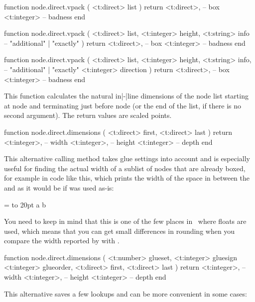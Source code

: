 \starttyping[option=LUA]
function node.direct.vpack (
    <t:direct> list
)
    return
        <t:direct>, -- box
        <t:integer> -- badness
end

function node.direct.vpack (
    <t:direct>  list,
    <t:integer> height,
    <t:string>  info -- "additional" | "exactly"
)
    return
        <t:direct>, -- box
        <t:integer> -- badness
end

function node.direct.vpack (
    <t:direct>  list,
    <t:integer> height,
    <t:string>  info, -- "additional" | "exactly"
    <t:integer> direction
)
    return
        <t:direct>, -- box
        <t:integer> -- badness
end
\stoptyping

This function calculates the natural in|-|line dimensions of the node list starting
at node  and terminating just before node  (or the end of the
list, if there is no second argument). The return values are scaled points.

\starttyping[option=LUA]
function node.direct.dimensions (
    <t:direct> first,
    <t:direct> last
)
    return
        <t:integer>, -- width
        <t:integer>, -- height
        <t:integer>  -- depth
end
\stoptyping

This alternative calling method takes glue settings into account and is especially useful for
finding the actual width of a sublist of nodes that are already boxed, for
example in code like this, which prints the width of the space in between the
 and  as it would be if  was used as-is:

\starttyping
{} = \hbox to 20pt {a b}

\stoptyping

You need to keep in mind that this is one of the few places in \TEX\ where floats
are used, which means that you can get small differences in rounding when you
compare the width reported by  with .

\starttyping[option=LUA]
function node.direct.dimensions (
    <t:number>  glueset,
    <t:integer> gluesign
    <t:integer> glueorder,
    <t:direct>  first,
    <t:direct>  last
)
    return
        <t:integer>, -- width
        <t:integer>, -- height
        <t:integer>  -- depth
end
\stoptyping

This alternative saves a few lookups and can be more convenient in some
cases:

